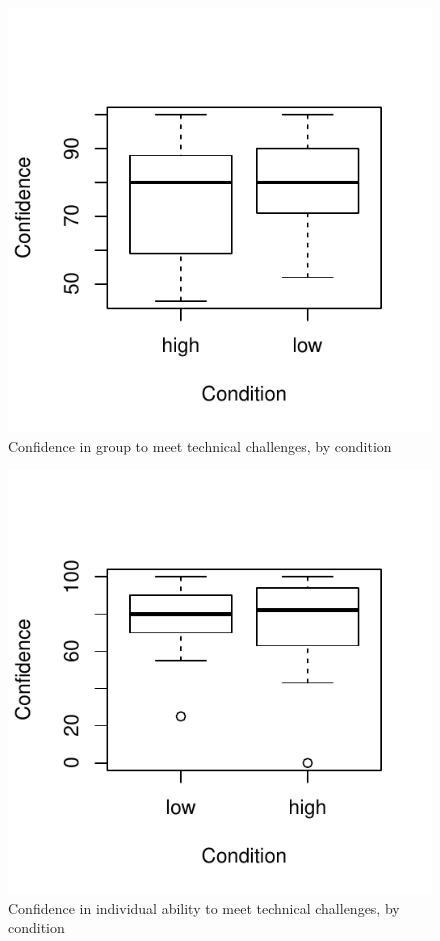 






\begin{figure}
  \centering
   \includegraphics[width=0.5\linewidth,keepaspectratio] {images/groupConfChallengesBoxplot-1}
  \caption{Confidence in group to meet technical challenges, by condition}
  \label{fig:groupConfChallengesBoxplot}
\end{figure}

\begin{figure}
  \centering
   \includegraphics[width=0.5\linewidth,keepaspectratio] {images/indConfChallengesBoxplot-1}
  \caption{Confidence in individual ability to meet technical challenges, by condition}
  \label{fig:indConfChallengesBoxplot}
\end{figure}


